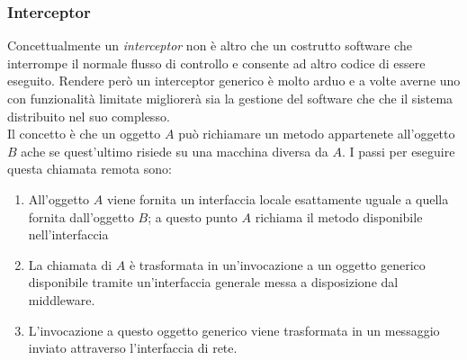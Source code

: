 \subsubsection{Interceptor}
Concettualmente un \emph{interceptor} non è altro che un costrutto software che interrompe il normale flusso di controllo e consente ad altro codice di essere eseguito. Rendere però un interceptor generico è molto arduo e a volte averne uno con funzionalità limitate migliorerà sia la gestione del software che che il sistema distribuito nel suo complesso.\\
Il concetto è che un oggetto $A$ può richiamare un metodo appartenete all'oggetto $B$ ache se quest'ultimo risiede su una macchina diversa da $A$.
I passi per eseguire questa chiamata remota sono:
\begin{enumerate}
\item All'oggetto $A$ viene fornita un interfaccia locale esattamente uguale a quella fornita dall'oggetto $B$; a questo punto $A$ richiama il metodo disponibile nell'interfaccia
\item La chiamata di $A$ è trasformata in un'invocazione a un oggetto generico disponibile tramite un'interfaccia generale messa a disposizione dal middleware.
\item L'invocazione a questo oggetto generico viene trasformata in un messaggio inviato attraverso l'interfaccia di rete.
\end{enumerate}
